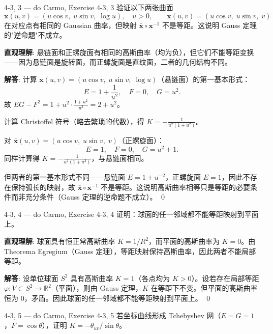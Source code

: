\begin{exercise}{4-3, 3 — do Carmo, Exercise 4-3, 3}
验证以下两张曲面
\[
\mathbf{x}(u,v) = (u\cos v,\; u\sin v,\; \log u),\quad u>0,\qquad
\bar{\mathbf{x}}(u,v) = (u\cos v,\; u\sin v,\; v)
\]
在对应点有相同的 Gaussian 曲率，但映射 $\bar{\mathbf{x}} \circ \mathbf{x}^{-1}$ 不是等距。这说明 Gauss 定理的"逆命题"不成立。
\end{exercise}

\begin{solution}
\textbf{直观理解}: 悬链面和正螺旋面有相同的高斯曲率（均为负），但它们不能等距变换——因为悬链面是旋转面，而正螺旋面是直纹面，二者的几何结构不同。

\textbf{解答}: 计算 $\mathbf{x}(u,v) = (u\cos v,\;u\sin v,\;\log u)$（悬链面）的第一基本形式：
\[
E = 1+\frac{1}{u^2},\quad F = 0,\quad G = u^2.
\]
故 $EG-F^2 = 1+u^2\cdot\frac{1+u^2}{u^2} = 2+u^2$。

计算 Christoffel 符号（略去繁琐的代数），得 $K = -\frac{1}{u^2(1+u^2)}$。

对 $\bar{\mathbf{x}}(u,v) = (u\cos v,\;u\sin v,\;v)$（正螺旋面）：
\[
E = 1,\quad F = 0,\quad G = u^2+1.
\]
同样计算得 $K = -\frac{1}{u^2(1+u^2)}$，与悬链面相同。

但两者的第一基本形式不同——悬链面 $E=1+u^{-2}$，正螺旋面 $E=1$，因此不存在保持弧长的映射，故 $\bar{\mathbf{x}}\circ\mathbf{x}^{-1}$ 不是等距。这说明高斯曲率相等只是等距的必要条件而非充分条件（Gauss 定理的逆命题不成立）。
\qed
\end{solution}

\begin{exercise}{4-3, 4 — do Carmo, Exercise 4-3, 4}
证明：球面的任一邻域都不能等距映射到平面上。
\end{exercise}

\begin{solution}
\textbf{直观理解}: 球面具有恒正常高斯曲率 $K=1/R^2$，而平面的高斯曲率为 $K=0$。由 Theorema Egregium（Gauss 定理），等距映射保持高斯曲率，因此两者不能局部等距。

\textbf{解答}: 设单位球面 $S^2$ 具有高斯曲率 $K=1$（各点均为 $K>0$）。设若存在局部等距 $\varphi: V\subset S^2 \to \mathbb{R}^2$（平面），则由 Gauss 定理，$K$ 在等距下不变。但平面的高斯曲率恒为 $0$，矛盾。因此球面的任一邻域都不能等距映射到平面上。
\qed
\end{solution}

\begin{exercise}{4-3, 5 — do Carmo, Exercise 4-3, 5}
若坐标曲线形成 Tchebyshev 网（$E=G=1$，$F=\cos\theta$），证明 $K = -\theta_{uv}/\sin\theta$。
\end{exercise}

